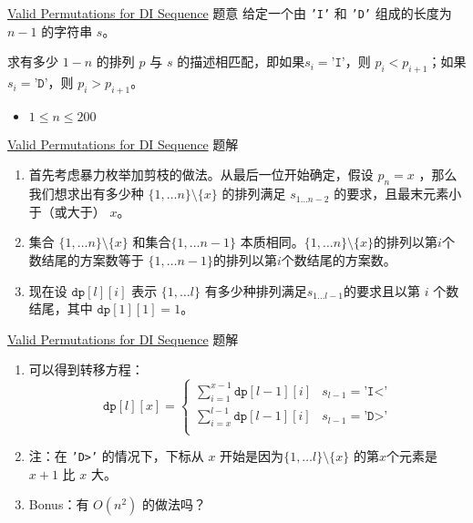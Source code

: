 \documentclass{beamer}
\begin{document}
\begin{frame}{\href{https://leetcode.com/problems/valid-permutations-for-di-sequence/}{Valid Permutations for DI Sequence}}
{题意}
给定一个由 \texttt{'I'} 和 \texttt{'D'} 组成的长度为 $n-1$ 的字符串 $s$。

求有多少 $1-n$ 的排列 $p$ 与 $s$ 的描述相匹配，即如果$s_i = \texttt{'I'}$，则 $p_i < p_{i+1}$；如果$s_i = \texttt{'D'}$，则 $p_i > p_{i+1}$。


\begin{itemize}
    \item $1 \leq n \leq 200$
\end{itemize}
\end{frame}


\begin{frame}{\href{https://leetcode.com/problems/valid-permutations-for-di-sequence/}{Valid Permutations for DI Sequence}}
{题解}

\begin{enumerate}
    \item 首先考虑暴力枚举加剪枝的做法。从最后一位开始确定，假设 $p_n = x$ ，那么我们想求出有多少种 $\{1,\ldots n\}\setminus \{x\}$ 的排列满足 $s_{1\ldots n-2}$ 的要求，且最末元素小于（或大于） $x$。 
    \item 集合 $\{1,\ldots n\}\setminus \{x\}$ 和集合$\{1,\ldots n-1\}$ 本质相同。$\{1,\ldots n\}\setminus \{x\}$的排列以第$i$个数结尾的方案数等于 $\{1,\ldots n-1\}$的排列以第$i$个数结尾的方案数。

    \item 现在设 $\texttt{dp}[l][i]$ 表示 $\{1,\ldots l\}$ 有多少种排列满足$s_{1\ldots l-1}$的要求且以第 $i$ 个数结尾，其中 $\texttt{dp}[1][1] = 1$。


\end{enumerate}
\end{frame}


\begin{frame}{\href{https://leetcode.com/problems/valid-permutations-for-di-sequence/}{Valid Permutations for DI Sequence}}
{题解}

\begin{enumerate}
    \item 可以得到转移方程：
        $$
        \texttt{dp}[l][x] = 
        \begin{cases}
         \displaystyle\sum_{i = 1}^{x-1}\texttt{dp}[l-1][i] & s_{l-1} = \texttt{'I<'}\\
         \displaystyle\sum_{i = x}^{l-1}\texttt{dp}[l-1][i] & s_{l-1} = \texttt{'D>'}\\
        \end{cases}
        $$
    \item 注：在 \texttt{'D>'} 的情况下，下标从 $x$ 开始是因为$\{1,\ldots l\}\setminus \{x\}$ 的第$x$个元素是 $x+1$ 比 $x$ 大。
    \item Bonus：有 $O(n^2)$ 的做法吗？ 

\end{enumerate}
\end{frame}
\end{document}
